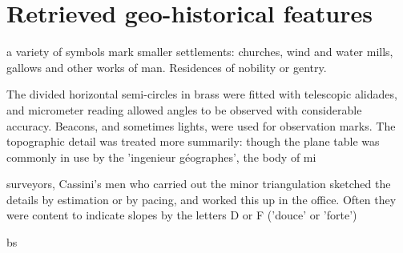 \documentclass[portrait, A0]{sciposter}
\begin{document}
\begin{minipage}[b]{77cm}
\section{Retrieved geo-historical features}
\begin{multicols}{3}
\setlength{\columnsep}{80pt}

\tiny{
a variety of symbols mark smaller settlements: churches, wind and water mills, gallows and other works of man. Residences of nobility or gentry.

\og The divided horizontal semi-circles in brass were fitted with telescopic alidades, and micrometer reading allowed angles to be observed with considerable accuracy. Beacons, and sometimes lights, were used for observation marks. The topographic detail was treated more summarily: though the plane table was commonly in use by the 'ingenieur géographes', the body of mi

\suy surveyors, Cassini's men who carried out the minor triangulation sketched the details by estimation or by pacing, and worked this up in the office. Often they were content to indicate slopes by the letters D or F ('douce' or 'forte') \fg [Crone 1953:131]}bs%
\footnotesize
{}\label{tab:stats}

\setcellgapes{2pt}


\end{multicols}
\end{minipage}
\end{document}
